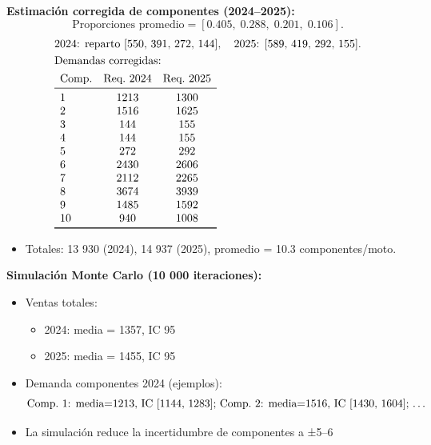 \documentclass[12pt,a4paper]{article}
\begin{document}
\begin{enumerate}
{    \item \textbf{Estimación corregida de componentes (2024–2025):}
    \[
    \text{Proporciones promedio} = [0.405,\;0.288,\;0.201,\;0.106].
    \]
    \[
    \begin{aligned}
    &\text{2024: reparto }[550,\,391,\,272,\,144],\quad \text{2025: }[589,\,419,\,292,\,155]. \\
    &\text{Demandas corregidas:}\\
    &\begin{array}{lcc}
    \text{Comp.} & \text{Req.\ 2024} & \text{Req.\ 2025} \\ \midrule
    1  & 1213 & 1300 \\
    2  & 1516 & 1625 \\
    3  & 144  & 155  \\
    4  & 144  & 155  \\
    5  & 272  & 292  \\
    6  & 2430 & 2606 \\
    7  & 2112 & 2265 \\
    8  & 3674 & 3939 \\
    9  & 1485 & 1592 \\
    10 & 940  & 1008 \\ \bottomrule
    \end{array}
    \end{aligned}
    \]
    \begin{itemize}
        \item Totales: 13 930 (2024), 14 937 (2025), promedio = 10.3 componentes/moto.
    \end{itemize}

    \item \textbf{Simulación Monte Carlo (10 000 iteraciones):}
    \begin{itemize}
        \item Ventas totales:
        \begin{itemize}
            \item 2024: media = 1357, IC 95 %
            \item 2025: media = 1455, IC 95 %
        \end{itemize}
        \item Demanda componentes 2024 (ejemplos):
        \[ \text{Comp.\ 1: media=1213, IC [1144, 1283]; Comp.\ 2: media=1516, IC [1430, 1604]; \dots} \]
        \item La simulación reduce la incertidumbre de componentes a ±5–6 %
    \end{itemize}

}
\end{enumerate}
\end{document}
